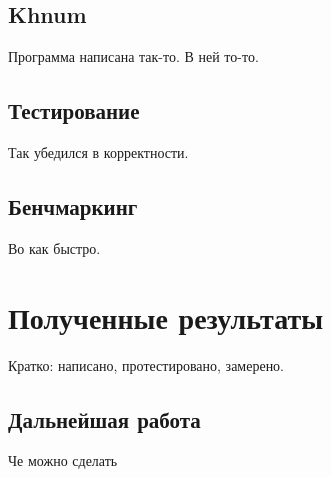 \documentclass[a4paper, 12pt, left=30mm, right=15mm, top=20mm, bottom=20mm]{report}
\begin{document}
\section{Khnum}
Программа написана так-то. В ней то-то. 

\section{Тестирование}
Так убедился в корректности.

\section{Бенчмаркинг}
Во как быстро.

\chapter{Полученные результаты}
Кратко: написано, протестировано, замерено.

\section{Дальнейшая работа}
Че можно сделать
\end{document}
